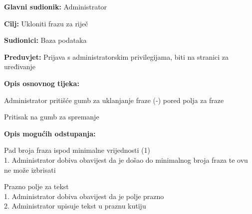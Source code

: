 					\noindent {}
					\begin{packed_item}
						\item \textbf{Glavni sudionik:} Administrator
						\item \textbf{Cilj:} Ukloniti frazu za riječ
						\item \textbf{Sudionici:} Baza podataka
						\item \textbf{Preduvjet:} Prijava s administratorskim privilegijama, biti na stranici za uređivanje
						\item \textbf{Opis osnovnog tijeka:}
						\begin{packed_enum}
							\item Administrator pritišće gumb za uklanjanje fraze (-) pored polja za fraze
							\item Pritisak na gumb za spremanje
						\end{packed_enum}
						\item \textbf{Opis mogućih odstupanja:}
						\begin{packed_item}
							\item [1.a] Pad broja fraza ispod minimalne vrijednosti (1)
							\\1. Administrator dobiva obavijest da je došao do minimalnog broja fraza te ovu ne može izbrisati
							\item [2.a] Prazno polje za tekst
							\\1. Administrator dobiva obavijest da je polje prazno
							\\2. Administrator upisuje tekst u praznu kutiju
						\end{packed_item}
					\end{packed_item}
					
